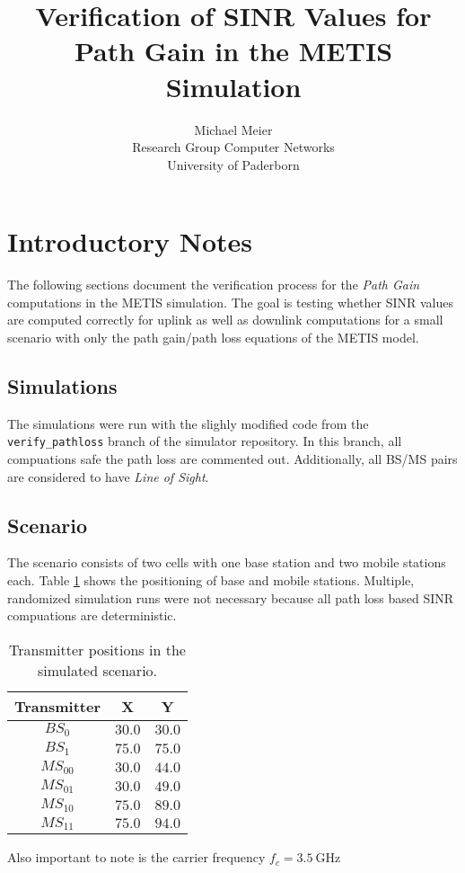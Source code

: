 \documentclass{article}
\begin{document}
\title{Verification of SINR Values for Path Gain in the METIS Simulation}
\author{Michael Meier\\ Research Group Computer Networks\\ University of Paderborn}
\maketitle

\section{Introductory Notes}
	The following sections document the verification process for the \emph{Path Gain} computations in the METIS simulation. The goal is testing whether SINR values are computed correctly for uplink as well as downlink computations for a small scenario with only the path gain/path loss equations of the METIS model. 
	\subsection{Simulations}
	The simulations were run with the slighly modified code from the \texttt{verify\_pathloss} branch of the simulator repository. In this branch, all compuations safe the path loss are commented out. Additionally, all BS/MS pairs are considered to have \emph{Line of Sight}.
	\subsection{Scenario}
	The scenario consists of two cells with one base station and two mobile stations each. Table \ref{trans:positions} shows the positioning of base and mobile stations. Multiple, randomized simulation runs were not necessary because all path loss based SINR compuations are deterministic.
	\begin{table}
		\centering
		\label{trans:positions}
		\caption{Transmitter positions in the simulated scenario.}
		\begin{tabular}{ccc}
			\toprule
			Transmitter & X & Y\\
			\midrule
			$BS_{0}$ & $30.0$ & $30.0$ \\
			$BS_{1}$ & $75.0$ & $75.0$ \\
			$MS_{00}$ & $30.0$ & $44.0$ \\
			$MS_{01}$ & $30.0$ & $49.0$ \\
			$MS_{10}$ & $75.0$ & $89.0$ \\
			$MS_{11}$ & $75.0$ & $94.0$ \\
			\bottomrule
		\end{tabular}
	\end{table}
	Also important to note is the carrier frequency $f_c=\SI{3.5}{\giga \hertz}$ 
	
\end{document}
